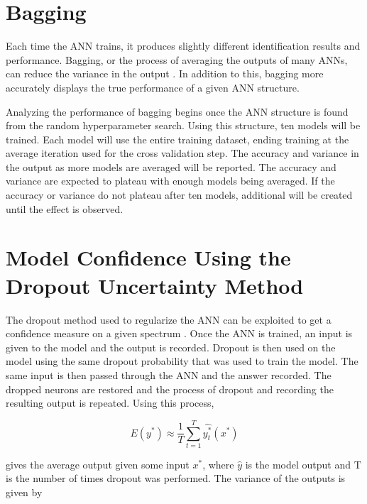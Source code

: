 \documentclass[tocnosub,noragright,centerchapter,12pt,fullpage]{uiucecethesis09}
\begin{document}
\section{Bagging} \label{Bagging}
Each time the ANN trains, it produces slightly different identification results and performance. Bagging, or the process of averaging the outputs of many ANNs, can reduce the variance in the output \cite{Breiman1996}. In addition to this, bagging more accurately displays the true performance of a given ANN structure.

Analyzing the performance of bagging begins once the ANN structure is found from the random hyperparameter search. Using this structure, ten models will be trained. Each model will use the entire training dataset, ending training at the average iteration used for the cross validation step. The accuracy and variance in the output as more models are averaged will be reported. The accuracy and variance are expected to plateau with enough models being averaged. If the accuracy or variance do not plateau after ten models, additional will be created until the effect is observed.


\iffalse
\section{Model Confidence Using the Dropout Uncertainty Method} \label{ModelConfidence}

The dropout method used to regularize the ANN can be exploited to get a confidence measure on a given spectrum \cite{Yarin2016}. Once the ANN is trained, an input is given to the model and the output is recorded. Dropout is then used on the model using the same dropout probability that was used to train the model. The same input is then passed through the ANN and the answer recorded. The dropped neurons are restored and the process of dropout and recording the resulting output is repeated. Using this process, 

\begin{equation} \label{eq:update1}
E (y^{*}) \approx \frac{1}{T} \sum^{T}_{t=1} \hat{y^{*}_t} (x^{*})
\end{equation}

gives the average output given some input $x^{*}$, where $\hat{y}$ is the model output and T is the number of times dropout was performed. The variance of the outputs is given by 
\end{document}
